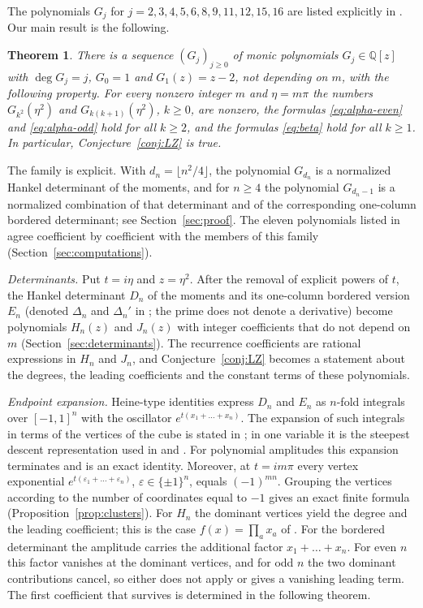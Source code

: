 \documentclass[11pt]{amsart}
\newtheorem{theorem}{Theorem}[section]
\theoremstyle{remark}
\numberwithin{equation}{section}
\newcommand{\Q}{\mathbb{Q}}
\begin{document}
The polynomials $G_j$ for $j=2,3,4,5,6,8,9,11,12,15,16$ are listed explicitly in \cite[Appendix~C(4)]{LZ}. Our main result is the following.

\begin{theorem}\label{thm:main}
There is a sequence $(G_j)_{j\ge0}$ of monic polynomials $G_j\in\Q[z]$ with $\deg G_j=j$, $G_0=1$ and $G_1(z)=z-2$, not depending on $m$, with the following property. For every nonzero integer $m$ and $\eta=m\pi$ the numbers $G_{k^2}(\eta^2)$ and $G_{k(k+1)}(\eta^2)$, $k\ge0$, are nonzero, the formulas \eqref{eq:alpha-even} and \eqref{eq:alpha-odd} hold for all $k\ge2$, and the formulas \eqref{eq:beta} hold for all $k\ge1$. In particular, Conjecture~\ref{conj:LZ} is true.
\end{theorem}

The family is explicit. With $d_n=\lfloor n^2/4\rfloor$, the polynomial $G_{d_n}$ is a normalized Hankel determinant of the moments, and for $n\ge4$ the polynomial $G_{d_n-1}$ is a normalized combination of that determinant and of the corresponding one-column bordered determinant; see Section~\ref{sec:proof}. The eleven polynomials listed in \cite[Appendix~C(4)]{LZ} agree coefficient by coefficient with the members of this family (Section~\ref{sec:computations}).

\smallskip
\emph{Determinants.} Put $t=i\eta$ and $z=\eta^2$. After the removal of explicit powers of $t$, the Hankel determinant $D_n$ of the moments and its one-column bordered version $E_n$ (denoted $\Delta_n$ and $\Delta_n'$ in \cite{MC}; the prime does not denote a derivative) become polynomials $H_n(z)$ and $J_n(z)$ with integer coefficients that do not depend on $m$ (Section~\ref{sec:determinants}). The recurrence coefficients are rational expressions in $H_n$ and $J_n$, and Conjecture~\ref{conj:LZ} becomes a statement about the degrees, the leading coefficients and the constant terms of these polynomials.

\emph{Endpoint expansion.} Heine-type identities express $D_n$ and $E_n$ as $n$-fold integrals over $[-1,1]^n$ with the oscillator $e^{t(x_1+\dots+x_n)}$. The expansion of such integrals in terms of the vertices of the cube is stated in \cite[Proposition~3.2]{CDHI}; in one variable it is the steepest descent representation used in \cite[Lemma~3.4]{MC} and \cite[(5)]{ADHW}. For polynomial amplitudes this expansion terminates and is an exact identity. Moreover, at $t=im\pi$ every vertex exponential $e^{t(\varepsilon_1+\dots+\varepsilon_n)}$, $\varepsilon\in\{\pm1\}^n$, equals $(-1)^{mn}$. Grouping the vertices according to the number of coordinates equal to $-1$ gives an exact finite formula (Proposition~\ref{prop:clusters}). For $H_n$ the dominant vertices yield the degree and the leading coefficient; this is the case $f(x)=\prod_a x_a$ of \cite[Theorem~3.8]{CDHI}. For the bordered determinant the amplitude carries the additional factor $x_1+\dots+x_n$. For even $n$ this factor vanishes at the dominant vertices, and for odd $n$ the two dominant contributions cancel, so \cite[Theorem~3.8]{CDHI} either does not apply or gives a vanishing leading term. The first coefficient that survives is determined in the following theorem.
\end{document}
